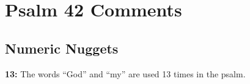 \section{Psalm 42 Comments}

\subsection{Numeric Nuggets}
\textbf{13: } The words ``God'' and ``my'' are used 13 times in the psalm.

